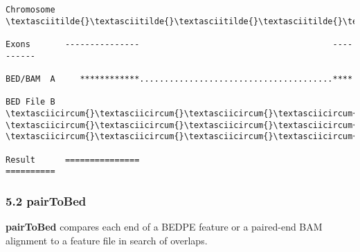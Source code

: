 \documentclass[letterpaper,10pt,english]{sphinxmanual}
\begin{document}
\begin{Verbatim}[commandchars=\\\{\}]
Chromosome  \textasciitilde{}\textasciitilde{}\textasciitilde{}\textasciitilde{}\textasciitilde{}\textasciitilde{}\textasciitilde{}\textasciitilde{}\textasciitilde{}\textasciitilde{}\textasciitilde{}\textasciitilde{}\textasciitilde{}\textasciitilde{}\textasciitilde{}\textasciitilde{}\textasciitilde{}\textasciitilde{}\textasciitilde{}\textasciitilde{}\textasciitilde{}\textasciitilde{}\textasciitilde{}\textasciitilde{}\textasciitilde{}\textasciitilde{}\textasciitilde{}\textasciitilde{}\textasciitilde{}\textasciitilde{}\textasciitilde{}\textasciitilde{}\textasciitilde{}\textasciitilde{}\textasciitilde{}\textasciitilde{}\textasciitilde{}\textasciitilde{}\textasciitilde{}\textasciitilde{}\textasciitilde{}\textasciitilde{}\textasciitilde{}\textasciitilde{}\textasciitilde{}\textasciitilde{}\textasciitilde{}\textasciitilde{}\textasciitilde{}\textasciitilde{}\textasciitilde{}\textasciitilde{}\textasciitilde{}\textasciitilde{}\textasciitilde{}\textasciitilde{}\textasciitilde{}\textasciitilde{}\textasciitilde{}\textasciitilde{}\textasciitilde{}\textasciitilde{}\textasciitilde{}\textasciitilde{}

Exons       ---------------                                       ----------

BED/BAM  A     ************.......................................****

BED File B  \textasciicircum{}\textasciicircum{}\textasciicircum{}\textasciicircum{}\textasciicircum{}\textasciicircum{}\textasciicircum{}\textasciicircum{}\textasciicircum{}\textasciicircum{}\textasciicircum{}\textasciicircum{}\textasciicircum{}\textasciicircum{}\textasciicircum{}                     \textasciicircum{}\textasciicircum{}\textasciicircum{}\textasciicircum{}\textasciicircum{}\textasciicircum{}\textasciicircum{}\textasciicircum{}          \textasciicircum{}\textasciicircum{}\textasciicircum{}\textasciicircum{}\textasciicircum{}\textasciicircum{}\textasciicircum{}\textasciicircum{}\textasciicircum{}\textasciicircum{}

Result      ===============                                       ==========
\end{Verbatim}


\subsubsection{5.2 pairToBed}
\label{content/pairToBed::doc}\label{content/pairToBed:pairtobed}
\textbf{pairToBed} compares each end of a BEDPE feature or a paired-end BAM alignment to a feature file in
search of overlaps.
\end{document}
